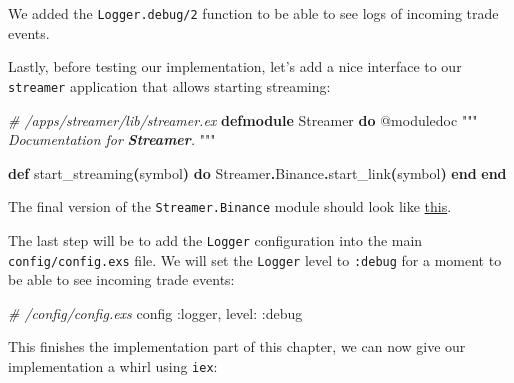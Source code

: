 \documentclass[
  oneside]{book}
\newenvironment{Shaded}{\begin{snugshade}}{\end{snugshade}}
\newcommand{\CommentTok}[1]{\textcolor[rgb]{0.56,0.35,0.01}{\textit{#1}}}
\newcommand{\ConstantTok}[1]{\textcolor[rgb]{0.56,0.35,0.01}{#1}}
\newcommand{\FunctionTok}[1]{\textcolor[rgb]{0.13,0.29,0.53}{\textbf{#1}}}
\newcommand{\InformationTok}[1]{\textcolor[rgb]{0.56,0.35,0.01}{\textbf{\textit{#1}}}}
\newcommand{\KeywordTok}[1]{\textcolor[rgb]{0.13,0.29,0.53}{\textbf{#1}}}
\newcommand{\NormalTok}[1]{#1}
\newcommand{\OperatorTok}[1]{\textcolor[rgb]{0.81,0.36,0.00}{\textbf{#1}}}
\newcommand{\OtherTok}[1]{\textcolor[rgb]{0.56,0.35,0.01}{#1}}
\newcommand{\VariableTok}[1]{\textcolor[rgb]{0.00,0.00,0.00}{#1}}
\begin{document}
We added the \texttt{Logger.debug/2} function to be able to see logs of incoming trade events.

\newpage

Lastly, before testing our implementation, let's add a nice interface to our \texttt{streamer} application that allows starting streaming:

\begin{Shaded}
\begin{Highlighting}[]
\CommentTok{\# /apps/streamer/lib/streamer.ex}
\KeywordTok{defmodule} \ConstantTok{Streamer} \KeywordTok{do}
  \OtherTok{@moduledoc """}
\CommentTok{  Documentation for }\InformationTok{\textasciigrave{}Streamer\textasciigrave{}}\CommentTok{.}
\CommentTok{  }\OtherTok{"""}

  \KeywordTok{def}\NormalTok{ start\_streaming}\FunctionTok{(}\NormalTok{symbol}\FunctionTok{)} \KeywordTok{do}
    \ConstantTok{Streamer}\OperatorTok{.}\ConstantTok{Binance}\OperatorTok{.}\NormalTok{start\_link}\FunctionTok{(}\NormalTok{symbol}\FunctionTok{)}
  \KeywordTok{end}
\KeywordTok{end}
\end{Highlighting}
\end{Shaded}

The final version of the \texttt{Streamer.Binance} module should look like \href{https://github.com/Cinderella-Man/hands-on-elixir-and-otp-cryptocurrency-trading-bot-source-code/blob/chapter_01/apps/streamer/lib/streamer/binance.ex}{this}.

The last step will be to add the \texttt{Logger} configuration into the main \texttt{config/config.exs} file. We will set the \texttt{Logger} level to \texttt{:debug} for a moment to be able to see incoming trade events:

\begin{Shaded}
\begin{Highlighting}[]
\CommentTok{\# /config/config.exs}
\NormalTok{config }\VariableTok{:logger}\NormalTok{,}
  \VariableTok{level:} \VariableTok{:debug}
\end{Highlighting}
\end{Shaded}

This finishes the implementation part of this chapter, we can now give our implementation a whirl using \texttt{iex}:
\end{document}
